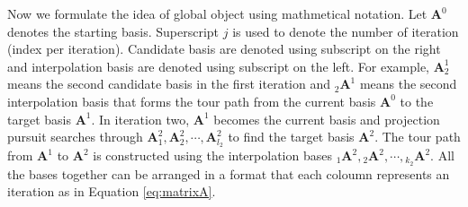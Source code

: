 \documentclass[12pt]{article}
\begin{document}
Now we formulate the idea of global object using mathmetical notation.
Let \(\mathbf{A}^0\) denotes the starting basis. Superscript \(j\) is
used to denote the number of iteration (index per iteration). Candidate
basis are denoted using subscript on the right and interpolation basis
are denoted using subscript on the left. For example,
\(\mathbf{A}^1_{2}\) means the second candidate basis in the first
iteration and \({}_{2}\mathbf{A}^1\) means the second interpolation
basis that forms the tour path from the current basis \(\mathbf{A}^0\)
to the target basis \(\mathbf{A}^1\). In iteration two, \(\mathbf{A}^1\)
becomes the current basis and projection pursuit searches through
\(\mathbf{A}^2_{1}, \mathbf{A}^2_{2}, \cdots, \mathbf{A}^2_{l_2}\) to
find the target basis \(\mathbf{A}^2\). The tour path from
\(\mathbf{A}^1\) to \(\mathbf{A}^2\) is constructed using the
interpolation bases
\({}_{1}\mathbf{A}^2, {}_{2}\mathbf{A}^2, \cdots, {}_{k_2}\mathbf{A}^2\).
All the bases together can be arranged in a format that each coloumn
represents an iteration as in Equation \ref{eq:matrixA}.
\end{document}
